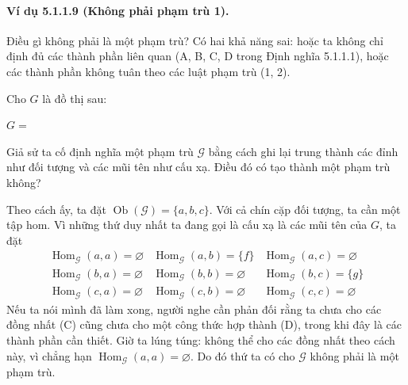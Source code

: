 \paragraph{Ví dụ 5.1.1.9 (Không phải phạm trù 1).} Điều gì không phải là một phạm trù? Có hai khả năng sai: hoặc ta không chỉ định đủ các thành phần liên quan (A, B, C, D trong Định nghĩa 5.1.1.1), hoặc các thành phần không tuân theo các luật phạm trù (1, 2).

Cho $G$ là đồ thị sau:
\begin{center}$G=$\quad{}\end{center}
Giả sử ta cố định nghĩa một phạm trù $\mathcal G$ bằng cách ghi lại trung thành các đỉnh như đối tượng và các mũi tên như cấu xạ. Điều đó có tạo thành một phạm trù không?

Theo cách ấy, ta đặt $\operatorname{Ob}(\mathcal G)=\{a,b,c\}$. Với cả chín cặp đối tượng, ta cần một tập hom. Vì những thứ duy nhất ta đang gọi là cấu xạ là các mũi tên của $G$, ta đặt
\begin{equation*}\begin{array}{lll}
\operatorname{Hom}_{\mathcal G}(a,a)=\varnothing&\operatorname{Hom}_{\mathcal G}(a,b)=\{f\}&\operatorname{Hom}_{\mathcal G}(a,c)=\varnothing\\
\operatorname{Hom}_{\mathcal G}(b,a)=\varnothing&\operatorname{Hom}_{\mathcal G}(b,b)=\varnothing&\operatorname{Hom}_{\mathcal G}(b,c)=\{g\}\\
\operatorname{Hom}_{\mathcal G}(c,a)=\varnothing&\operatorname{Hom}_{\mathcal G}(c,b)=\varnothing&\operatorname{Hom}_{\mathcal G}(c,c)=\varnothing
\end{array}\tag{5.1*}\end{equation*}
Nếu ta nói mình đã làm xong, người nghe cần phản đối rằng ta chưa cho các đồng nhất (C) cũng chưa cho một công thức hợp thành (D), trong khi đây là các thành phần cần thiết. Giờ ta lúng túng: không thể cho các đồng nhất theo cách này, vì chẳng hạn $\operatorname{Hom}_{\mathcal G}(a,a)=\varnothing$. Do đó thứ ta có cho $\mathcal G$ không phải là một phạm trù.


